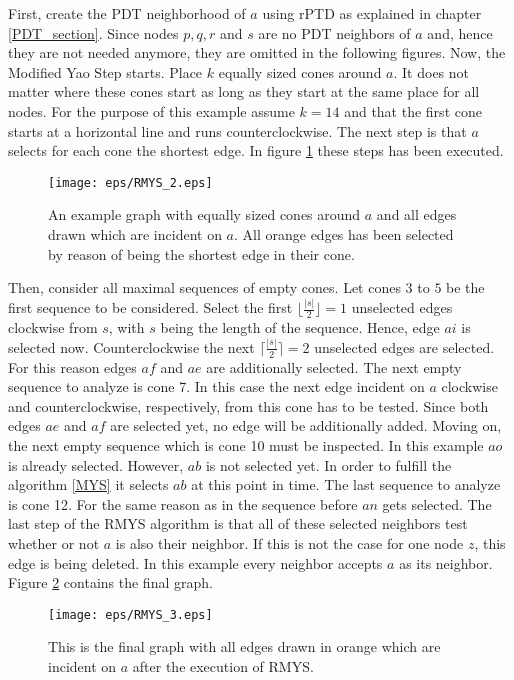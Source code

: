 First, create the PDT neighborhood of $a $ using rPTD as explained in chapter \ref{PDT_section}.
Since nodes $p, q, r $ and $s $ are no PDT neighbors of $a $ and, hence they are not needed anymore, they are omitted in the following figures.
Now, the Modified Yao Step starts.
Place $k $ equally sized cones around $a $.
It does not matter where these cones start as long as they start at the same place for all nodes.
For the purpose of this example assume $k=14 $ and that the first cone starts at a horizontal line and runs counterclockwise.
The next step is that $a $ selects for each cone the shortest edge.
In figure \ref{fig:RMYS_2} these steps has been executed.
\begin{figure}[h!]
\centering
\texttt{[image: eps/RMYS\_2.eps]}
\caption{An example graph with equally sized cones around $a $ and all edges drawn which are incident on $a $. All orange edges has been selected by reason of being the shortest edge in their cone.}
\label{fig:RMYS_2}
\end{figure}
Then, consider all maximal sequences of empty cones.
Let cones $3 $ to $5 $ be the first sequence to be considered.
Select the first $\lfloor \frac{|s|}{2} \rfloor = 1 $ unselected edges clockwise from $s $, with $s $ being the length of the sequence.
Hence, edge $ai $ is selected now.
Counterclockwise the next $\lceil \frac{|s|}{2} \rceil = 2$ unselected edges are selected.
For this reason edges $af $ and $ae $ are additionally selected.
The next empty sequence to analyze is cone 7.
In this case the next edge incident on $a $ clockwise and counterclockwise, respectively, from this cone has to be tested.
Since both edges $ae $ and $af $ are selected yet, no edge will be additionally added.
Moving on, the next empty sequence which is cone 10 must be inspected.
In this example $ao $ is already selected. 
However, $ab $ is not selected yet.
In order to fulfill the algorithm \ref{MYS} it selects $ab $ at this point in time.
The last sequence to analyze is cone 12.
For the same reason as in the sequence before $an $ gets selected.
The last step of the RMYS algorithm is that all of these selected neighbors test whether or not $a $ is also their neighbor.
If this is not the case for one node $z $, this edge is being deleted.
In this example every neighbor accepts $a $ as its neighbor.
Figure \ref{fig:RMYS_3} contains the final graph.

\begin{figure}[h!]
\centering
\texttt{[image: eps/RMYS\_3.eps]}
\caption{This is the final graph with all edges drawn in orange which are incident on $a $ after the execution of RMYS.}
\label{fig:RMYS_3}
\end{figure}




